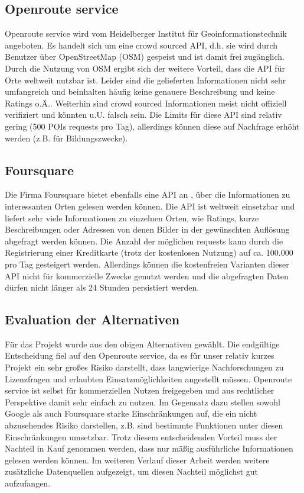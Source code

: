 \subsection{Openroute service}
Openroute service \cite{openroute2019} wird vom Heidelberger Institut für Geoinformationstechnik angeboten. Es handelt sich um eine crowd sourced API, d.h. sie wird durch Benutzer über OpenStreetMap (OSM) \cite{openstreetmap2020} gespeist und ist damit frei zugänglich. Durch die Nutzung von OSM ergibt sich der weitere Vorteil, dass die API für Orte weltweit nutzbar ist. Leider sind die gelieferten Informationen nicht sehr umfangreich und beinhalten häufig keine genauere Beschreibung und keine Ratings o.Ä.. Weiterhin sind crowd sourced Informationen meist nicht offiziell verifiziert und könnten u.U. falsch sein. Die Limits für diese API sind relativ gering (500 POIs requests pro Tag), allerdings können diese auf Nachfrage erhöht werden (z.B. für Bildungszwecke).

\subsection{Foursquare}
Die Firma Foursquare bietet ebenfalls eine API an \cite{foursquare2019}, über die Informationen zu interessanten Orten gelesen werden können. Die API ist weltweit einsetzbar und liefert sehr viele Informationen zu einzelnen Orten, wie Ratings, kurze Beschreibungen oder Adressen von denen Bilder in der gewünschten Auflösung abgefragt werden können. Die Anzahl der möglichen requests kann durch die Registrierung einer Kreditkarte (trotz der kostenlosen Nutzung) auf ca. 100.000 pro Tag gesteigert werden. Allerdings können die kostenfreien Varianten dieser API nicht für kommerzielle Zwecke genutzt werden und die abgefragten Daten dürfen nicht länger als 24 Stunden persistiert werden. 

\subsection{Evaluation der Alternativen}
Für das Projekt wurde aus den obigen Alternativen gewählt. Die endgültige Entscheidung fiel auf den Openroute service, da es für unser relativ kurzes Projekt ein sehr großes Risiko darstellt, dass langwierige Nachforschungen zu Lizenzfragen und erlaubten Einsatzmöglichkeiten angestellt müssen. Openroute service ist selbst für kommerziellen Nutzen freigegeben und aus rechtlicher Perspektive damit sehr einfach zu nutzen. Im Gegensatz dazu stellen sowohl Google als auch Foursquare starke Einschränkungen auf, die ein nicht abzusehendes Risiko darstellen, z.B. sind bestimmte Funktionen unter diesen Einschränkungen umsetzbar. Trotz diesem entscheidenden Vorteil muss der Nachteil in Kauf genommen werden, dass nur mäßig ausführliche Informationen gelesen werden können. Im weiteren Verlauf dieser Arbeit werden weitere zusätzliche Datenquellen aufgezeigt, um diesen Nachteil möglichst gut aufzufangen.

